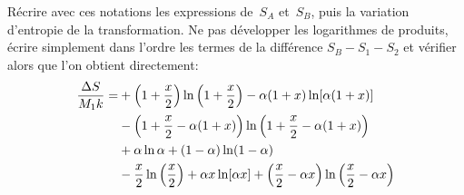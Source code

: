 \documentclass[utf8, 11pt]{feuille}
\begin{document}
\question
Récrire avec ces notations les expressions de~$S_A$ et~$S_B$, puis la
variation d'entropie de la transformation. Ne pas développer les
logarithmes de produits, écrire simplement dans l'ordre les termes de la
différence $S_B - S_1 - S_2$ et vérifier alors que l'on obtient
directement:
\begin{align*}
{ \Delta S \over M_1 k} = &+ \left( 1 + {x\over 2} \right) \ln\left( 1
  + {x\over 2} \right) - \alpha (1+x) \ln [\alpha (1+x)] \\
  & -\left( 1 + {x\over 2} - \alpha(1+x) \right)
          \ln\left(1+ {x\over 2} - \alpha(1+x) \right) \\
          &+ \alpha \ln\alpha + (1-\alpha) \ln (1-\alpha) \\
          &- {x\over 2} \ln \left( {x\over 2} \right) + \alpha x \ln[\alpha x]
          + \left( {x\over 2} -\alpha x\right) \ln \left( {x\over 2}
          - \alpha x \right)
\end{align*}
\end{document}
